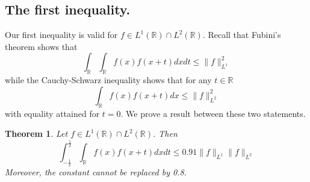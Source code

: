 \documentclass{amsart}
\newtheorem{theorem}{Theorem}
\theoremstyle{remark}
\begin{document}
\subsection{The first inequality.} Our first inequality is valid for $f \in L^1(\mathbb{R}) \cap L^2(\mathbb{R})$.
Recall that Fubini's theorem shows that
$$ \int_{\mathbb{R}}  \int_{\mathbb{R}}{f(x) f(x+t) dx} dt \leq \|f\|_{L^1}^2$$
while the Cauchy-Schwarz inequality shows that for any $t \in \mathbb{R}$
$$  \int_{\mathbb{R}}{f(x) f(x+t) dx}  \leq \|f\|_{L^2}^2$$
with equality attained for $t=0$. We prove a result between these two statements.
\begin{theorem} Let $f \in L^1(\mathbb{R}) \cap L^2(\mathbb{R})$. Then
$$ \int_{-\frac{1}{2}}^{\frac{1}{2}}{ \int_{\mathbb{R}}{f(x) f(x+t) dx}dt} \leq 0.91 \|f\|_{L^1}\|f\|_{L^2}$$
Moreover, the constant cannot be replaced by 0.8.
\end{theorem}
\end{document}
